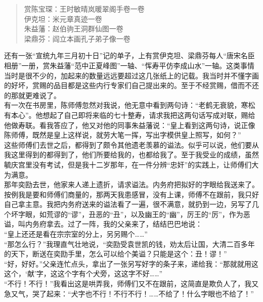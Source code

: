 \begin{quote}
	赏陈宝琛：王时敏晴岚暖翠阁手卷一卷\\

伊克坦：米元章真迹一卷\\

朱益藩：赵伯驹王洞群仙图一卷\\

梁鼎芬：阎立本画孔子弟子像一卷\\
\end{quote}

还有一张“宣统九年三月初十日”记的单子，上有赏伊克坦、梁鼎芬每人“唐宋名臣相册”一册，赏朱益藩“范中正夏峰图”一轴、“恽寿平仿李成山水”一轴。这类事情当时是很不少的，加起来的数量远远要超过这几张纸上的记载。我当时并不懂字画的好坏，赏赐的品目都是这些内行专家们自己提出来的。至于不经赏赐，借而不还的那就更难说了。\\

有一次在书房里，陈师傅忽然对我说，他无意中看到两句诗：“老鹤无衰貌，寒松有本心”。他想起了自己即将来临的七十整寿，请求我把这两句话写成对联，赐给他做寿联。看我答应了，他又对他的同事朱益藩说：“皇上看到这两句诗，说正像陈师傅，既然是皇上这样说，就劳大笔一挥，写出字模供皇上照写，如何？”\\

这些师傅们去世之后，都得到了颇令其他遗老羡慕的谥法。似乎可以说，他们要从我这里得到的都得到了，他们所要给我的，也都给我了。至于我受业的成绩，虽然毓庆宫里没有考试，但是我十二岁那年，在一件分辨“忠奸”的实践上，让师傅们大为满意。\\

那年奕劻去世，他家来人递上遗折，请求谥法。内务府把拟好的字眼给我送来了。按例我是要和师傅们商量的，那两天我患感冒，没有上课，师傅不在跟前，我只好自己拿主意。我把内务府送来的谥法看了一遍，很不满意，就扔到一边，另写了几个坏字眼，如荒谬的“谬”，丑恶的“丑”，以及幽王的“幽”，厉王的“厉”，作为恶谥，叫内务府拿去。过了一阵，我的父亲来了，结结巴巴地说：\\

“皇上还还是看在宗宗室的分上，另另赐个……”\\

“那怎么行？”我理直气壮地说，“奕劻受袁世凯的钱，劝太后让国，大清二百多年的天下，断送在奕劻手里，怎么可以给个美谥？只能是这个：丑！谬！”\\

“好，好好。”父亲连忙点头，拿出了一张另写好字的条子来，递给我：“那就就用这这个，‘献’字，这这个字有个犬旁，这这字不好……”\\

“不行！不行！”我看出这是哄弄我，师傅们又不在跟前，这简直是欺负人了，我又急又气，哭了起来：“犬字也不行！不行不行！……不给了！什么字眼也不给了！”\\

